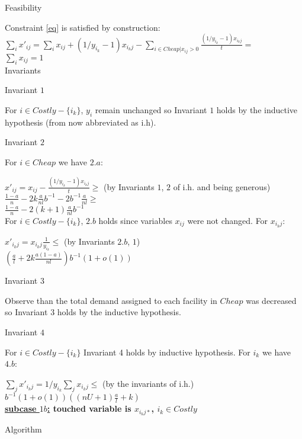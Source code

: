 \documentclass[11pt]{article}\usepackage{amsmath}
\begin{document}
{\sc Feasibility}

Constraint \eqref{eq} is satisfied by construction:\\

\noindent
$\sum_i x'_{ij}=\sum_i x_{ij} +(1/y_{i_k}-1)x_{i_kj}-\sum_{i \in Cheap| x_{ij}>0}\frac{(1/y_{i_k}-1)x_{i_kj}}{t}=$\\
$\sum_i x_{ij}=1$\\

{\sc Invariants}

{\sf Invariant $1$}

For $i \in Costly-\{i_k\}$, $y_i$ remain unchanged so Invariant $1$ holds by
the inductive hypothesis (from now abbreviated as i.h).

{\sf Invariant $2$}

For $i \in Cheap$ we have $2.a$:

\noindent
$x'_{ij}=x_{ij}-\frac{(1/y_{i_k}-1)x_{i_kj}}{t}\geq$ \hfill  (by Invariants $1$, $2$ of i.h. and being  generous)\\
$\frac{1-a}{n}-2k\frac{a}{nl}b^{-1}-2b^{-1}\frac{a}{nl}\geq$\\
$\frac{1-a}{n}-2(k+1)\frac{a}{nl}b^{-1}$\\

For $i \in Costly-\{i_k\}$, $2.b$ holds since variables $x_{ij}$ were not changed. For $x_{i_kj}$:

\noindent
$x'_{i_kj}=x_{i_kj}\frac{1}{y_{i_k}}\leq$ \hfill (by Invariants $2.b$, $1$)\\
$(\frac{a}{l}+2k\frac{a(1-a)}{nl})b^{-1}(1+o(1))$

{\sf Invariant $3$}

Observe than the total demand assigned to each facility in $Cheap$ was decreased so Invariant $3$ holds by the 
inductive hypothesis.

{\sf Invariant $4$}

For $i \in Costly-\{i_k\}$ Invariant 4 holds by inductive hypothesis. For $i_k$ we have $4.b$:

\noindent
$\sum_j x'_{i_kj}=1/y_{i_k}\sum_j x_{i_kj}\leq$ \hfill  (by the invariants of i.h.)\\
$b^{-1}(1+o(1))((nU+1)\frac{a}{l}+k)$\\






\medskip
\noindent
  {\bf \underline{subcase $1b$:} touched variable is  $x_{i_kj*}$, $i_k \in Costly$}

{\sc Algorithm}
\end{document}
